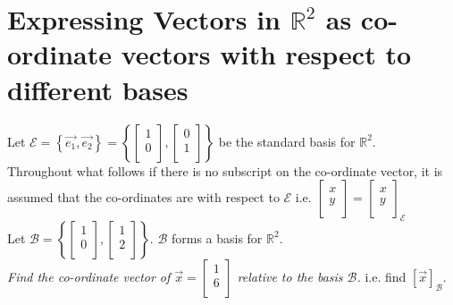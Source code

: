 \documentclass{report}
\begin{document}
   \section{Expressing Vectors in $ \mathbb{R} ^2$ as co-ordinate vectors with respect to different bases}
   Let $ \mathcal{E} = \left\{ \vec{ e_1} , \vec{ e_2}  \right\} = \left\{ \begin{bmatrix}
   1\\
   0\\
   \end{bmatrix}
   , \begin{bmatrix}
   0\\
   1\\
   \end{bmatrix}
    \right\}$ be the standard basis for $ \mathbb{R} ^2$.\\
    Throughout what follows if there is no subscript on the co-ordinate vector, it is assumed that the co-ordinates are with respect to $ \mathcal{E}$ i.e.  $ \begin{bmatrix}
    x\\
    y\\
    \end{bmatrix}
    = \begin{bmatrix}
    x\\
    y\\
    \end{bmatrix}
    _{ \mathcal{E}}$ \\
    Let $ \mathcal{B} = \left\{ \begin{bmatrix}
    1\\
    0\\
    \end{bmatrix}
    , \begin{bmatrix}
    1\\
    2\\
    \end{bmatrix}
    \right\}$. $ \mathcal{B} $ forms a basis for $ \mathbb{R} ^2$.\\
    \textit{Find the co-ordinate vector  of $ \vec{ x} = \begin{bmatrix}
    1\\
    6\\
    \end{bmatrix}
   $ relative to the basis $ \mathcal{B}$.} i.e.  find $  \left[ \vec{ x}  \right] _{ \mathcal{B}}$.\\
\end{document}
